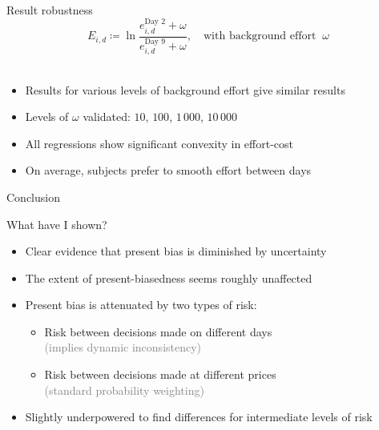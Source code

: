 \documentclass[professionalfont,10pt]{beamer}
\begin{document}
\begin{frame}{Result robustness}
$$E_{i,d} \coloneqq \ln\frac{e_{i,d}^\text{Day 2}+\omega}{e_{i,d}^\text{Day 9}+\omega}, \quad \text{with background effort} \;\; \omega$$\\
\begin{itemize}[<+->]
\item Results for various levels of background effort give similar results \\
\item Levels of $\omega$ validated: $10$, $100$, $1\,000$, $10\,000$
\vspace{3\baselineskip}
\item All regressions show significant convexity in effort-cost
\item On average, subjects prefer to smooth effort between days
\end{itemize}
\end{frame}

\begin{frame}
\vfill
\begin{center}
{\Large Conclusion}
\end{center}
\vfill
\end{frame}

\begin{frame}{What have I shown?}
\begin{itemize}[<+->]
\item \alert{Clear evidence that present bias is diminished by uncertainty}
\vspace{1\baselineskip}
\item The extent of present-biasedness seems roughly unaffected
\vspace{1\baselineskip}
\item Present bias is attenuated by two types of risk:
\begin{itemize}[<+->]
\item Risk between decisions made on different days \\ \textcolor{gray}{ (implies dynamic inconsistency) }
\item Risk between decisions made at different prices \\ \textcolor{gray}{ (standard probability weighting) }
\end{itemize}
\vspace{1\baselineskip}
\item Slightly underpowered to find differences for intermediate levels of risk
\end{itemize}
\end{frame}
\end{document}
